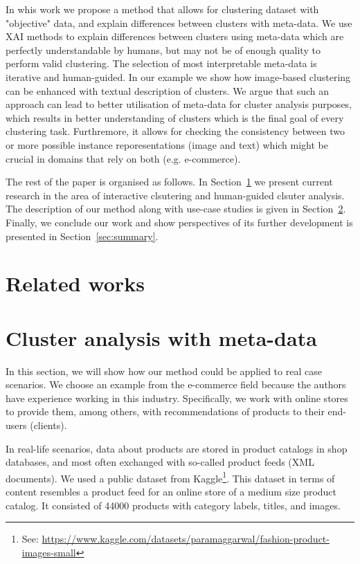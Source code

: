 \documentclass[
 twocolumn,
]{ceurart}
\begin{document}
In whis work we propose a method that allows for clustering dataset with "objective" data, and explain differences between clusters with meta-data.
We use XAI methods to explain differences between clusters using meta-data which are perfectly understandable by humans, but may not be of enough quality to perform valid clustering.
The selection of most interpretable meta-data is iterative and human-guided.
In our example we show how image-based clustering can be enhanced with textual description of clusters.
We argue that such an approach can lead to better utilisation of meta-data for cluster analysis purposes, which results in better understanding of clusters which is the final goal of every clustering task. %
Furthremore, it allows for checking the consistency between two or more possible instance reporesentations (image and text) which might be crucial in domains that rely on both (e.g. e-commerce).



The rest of the paper is organised as follows.
In Section~\ref{sec:sota} we present current research in the area of interactive clsutering and human-guided clsuter analysis.
The description of our method along with use-case studies is given in Section~\ref{sec:clumeta}.
Finally, we conclude our work and show perspectives of its further development is presented in Section~\ref{sec:summary}.

\section{Related works}
\label{sec:sota}

\section{Cluster analysis with meta-data}
\label{sec:clumeta}
In this section, we will show how our method could be applied to real case scenarios.
We choose an example from the e-commerce field because the authors have experience working in this industry.
Specifically, we work with online stores to provide them, among others, with recommendations of products to their end-users (clients).

In real-life scenarios, data about products are stored in product catalogs in shop databases, and most often exchanged with so-called product feeds (XML documents).
We used a public dataset from Kaggle\footnote{See: \url{https://www.kaggle.com/datasets/paramaggarwal/fashion-product-images-small}}.
This dataset in terms of content resembles a product feed for an online store of a medium size product catalog.
It consisted of 44000 products with category labels, titles, and images.
\end{document}
